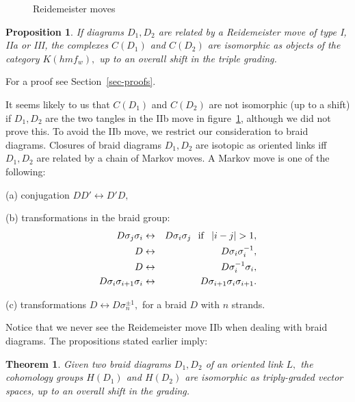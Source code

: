 \documentclass[12pt]{article}
\newtheorem{prop}{Proposition}
\newtheorem{theorem}{Theorem}
\begin{document}
\begin{figure}  \caption{Reidemeister moves} \label{reid}
 \end{figure}

\begin{prop} If diagrams $D_1, D_2$ are related by a Reidemeister move 
of type I, IIa or III, the complexes $C(D_1)$ and $C(D_2)$ are isomorphic 
as objects of the category $K(hmf_w),$ up to an overall shift in 
the triple grading.   
\end{prop} 

For a proof see Section~\ref{sec-proofs}. 

\vspace{0.1in} 

It seems likely to us that $C(D_1)$ and $C(D_2)$ are not isomorphic
(up to a shift)  
if $D_1, D_2$ are the two tangles in the IIb move in figure~\ref{reid}, 
although we did not prove this. To avoid the IIb move, we restrict our 
consideration to braid diagrams. Closures of braid diagrams $D_1, D_2$ 
are isotopic as oriented links iff $D_1, D_2$ are 
related by a chain of Markov moves. A Markov move is one of the following:  

(a) conjugation $DD' \leftrightarrow D'D,$

(b) transformations in the braid group:  
\begin{eqnarray*} 
D\sigma_j \sigma_i & \leftrightarrow & D \sigma_i \sigma_j \hspace{0.1in} \mathrm{if} 
 \hspace{0.1in} |i-j|>1, \\ 
D & \leftrightarrow & D \sigma_i \sigma_i^{-1},  \\
D & \leftrightarrow & D \sigma_i^{-1} \sigma_i,  \\
D \sigma_i \sigma_{i+1}\sigma_i & \leftrightarrow & D \sigma_{i+1}
  \sigma_{i} \sigma_{i+1} .
\end{eqnarray*} 

(c) transformations $D \leftrightarrow D \sigma_n^{\pm 1},$ 
for a braid $D$ with $n$ strands. 

\vspace{0.1in} 

Notice that we never see the Reidemeister move IIb when dealing 
with braid diagrams. The propositions stated earlier imply: 

\begin{theorem} 
Given two braid diagrams $D_1,D_2$ of an oriented link $L,$ 
the cohomology groups $H(D_1)$ and $H(D_2)$ are isomorphic as 
triply-graded vector spaces, up to an overall shift in the grading. 
\end{theorem} 
\end{document}
